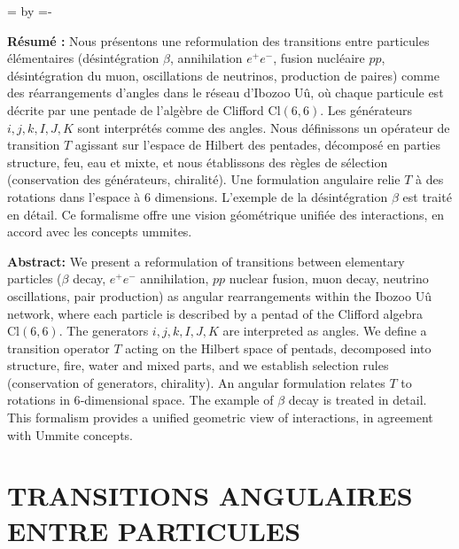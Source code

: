 \documentclass[11pt]{article}
\begin{document}
\abstractheight=
\advance\abstractheight by 
\newlength{\remaining}
\remaining=\dimexpr\textheight - \pagetotal\relax
\ifdim\abstractheight > \remaining
\enlargethispage{\dimexpr\abstractheight - \remaining\relax}
\fi
\begin{center}
\begin{minipage}{0.85\textwidth}
\noindent \textbf{Résumé :} Nous présentons une reformulation des
transitions entre particules élémentaires (désintégration \(\beta\),
annihilation \(e^+e^-\), fusion nucléaire \(pp\), désintégration du
muon, oscillations de neutrinos, production de paires) comme des
réarrangements d'angles dans le réseau d'Ibozoo Uû, où chaque particule
est décrite par une pentade de l'algèbre de Clifford \(\text{Cl}(6,6)\).
Les générateurs \(i,j,k,I,J,K\) sont interprétés comme des angles. Nous
définissons un opérateur de transition \(T\) agissant sur l'espace de
Hilbert des pentades, décomposé en parties structure, feu, eau et mixte,
et nous établissons des règles de sélection (conservation des
générateurs, chiralité). Une formulation angulaire relie \(T\) à des
rotations dans l'espace à 6 dimensions. L'exemple de la désintégration
\(\beta\) est traité en détail. Ce formalisme offre une vision
géométrique unifiée des interactions, en accord avec les concepts
ummites.
\end{minipage}
\end{center}
\vspace{0.5cm}
\begin{center}
\begin{minipage}{0.85\textwidth}
\noindent \textbf{Abstract:} We present a reformulation of transitions
between elementary particles (\(\beta\) decay, \(e^+e^-\) annihilation,
\(pp\) nuclear fusion, muon decay, neutrino oscillations, pair
production) as angular rearrangements within the Ibozoo Uû network,
where each particle is described by a pentad of the Clifford algebra
\(\text{Cl}(6,6)\). The generators \(i,j,k,I,J,K\) are interpreted as
angles. We define a transition operator \(T\) acting on the Hilbert
space of pentads, decomposed into structure, fire, water and mixed
parts, and we establish selection rules (conservation of generators,
chirality). An angular formulation relates \(T\) to rotations in
6‑dimensional space. The example of \(\beta\) decay is treated in
detail. This formalism provides a unified geometric view of
interactions, in agreement with Ummite concepts.
\end{minipage}
\end{center}
\vspace{1cm}
\tableofcontents
\newpage
\clearpage
\pagestyle{fancy}
\hypertarget{transitions-angulaires-entre-particules}{%
\section{TRANSITIONS ANGULAIRES ENTRE
PARTICULES}\label{transitions-angulaires-entre-particules}}
\end{document}
